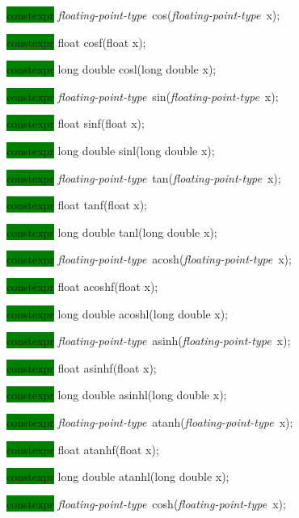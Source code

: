 \documentclass[prd,twocolumn,amsmath,amssymb,nofootinbib,eqsecnum]{revtex4-1}
\newcommand{\highlight}[1]{\colorbox{green}{\!\!\!\! #1}}
\newcommand{\fptype}{{\it floating-point-type}}
\begin{document}
{%

\highlight{constexpr} \fptype\ cos(\fptype\ x);

\highlight{constexpr} float cosf(float x);

\highlight{constexpr} long double cosl(long double x);

\vspace{2ex}


\highlight{constexpr} \fptype\ sin(\fptype\ x);

\highlight{constexpr} float sinf(float x);

\highlight{constexpr} long double sinl(long double x);

\vspace{2ex}


\highlight{constexpr} \fptype\ tan(\fptype\ x);

\highlight{constexpr} float tanf(float x);

\highlight{constexpr} long double tanl(long double x);

\vspace{2ex}


\highlight{constexpr} \fptype\ acosh(\fptype\ x);

\highlight{constexpr} float acoshf(float x);

\highlight{constexpr} long double acoshl(long double x);

\vspace{2ex}


\highlight{constexpr} \fptype\ asinh(\fptype\ x);

\highlight{constexpr} float asinhf(float x);

\highlight{constexpr} long double asinhl(long double x);

\vspace{2ex}


\highlight{constexpr} \fptype\ atanh(\fptype\ x);

\highlight{constexpr} float atanhf(float x);

\highlight{constexpr} long double atanhl(long double x);

\vspace{2ex}


\highlight{constexpr} \fptype\ cosh(\fptype\ x);

}
\end{document}
